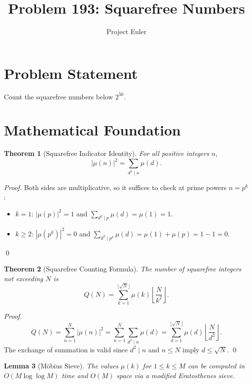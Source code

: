\documentclass[12pt]{article}
\title{Problem 193: Squarefree Numbers}
\author{Project Euler}
\date{}
\newtheorem{theorem}{Theorem}
\newtheorem{lemma}[theorem]{Lemma}
\begin{document}
\maketitle

\section{Problem Statement}

Count the squarefree numbers below $2^{50}$.

\section{Mathematical Foundation}

\begin{theorem}[Squarefree Indicator Identity]
For all positive integers $n$,
\[
|\mu(n)|^2 = \sum_{d^2 \mid n} \mu(d).
\]
\end{theorem}

\begin{proof}
Both sides are multiplicative, so it suffices to check at prime powers $n = p^k$:
\begin{itemize}
    \item $k = 1$: $|\mu(p)|^2 = 1$ and $\sum_{d^2 \mid p} \mu(d) = \mu(1) = 1$. \checkmark
    \item $k \geq 2$: $|\mu(p^k)|^2 = 0$ and $\sum_{d^2 \mid p^k} \mu(d) = \mu(1) + \mu(p) = 1 - 1 = 0$. \checkmark
\end{itemize}
\qed
\end{proof}

\begin{theorem}[Squarefree Counting Formula]
The number of squarefree integers not exceeding $N$ is
\[
Q(N) = \sum_{k=1}^{\lfloor \sqrt{N} \rfloor} \mu(k) \left\lfloor \frac{N}{k^2} \right\rfloor.
\]
\end{theorem}

\begin{proof}
\[
Q(N) = \sum_{n=1}^{N} |\mu(n)|^2 = \sum_{n=1}^{N} \sum_{d^2 \mid n} \mu(d) = \sum_{d=1}^{\lfloor\sqrt{N}\rfloor} \mu(d) \left\lfloor \frac{N}{d^2} \right\rfloor.
\]
The exchange of summation is valid since $d^2 \mid n$ and $n \leq N$ imply $d \leq \sqrt{N}$. \qed
\end{proof}

\begin{lemma}[M\"obius Sieve]
The values $\mu(k)$ for $1 \leq k \leq M$ can be computed in $O(M \log\log M)$ time and $O(M)$ space via a modified Eratosthenes sieve.
\end{lemma}
\end{document}
